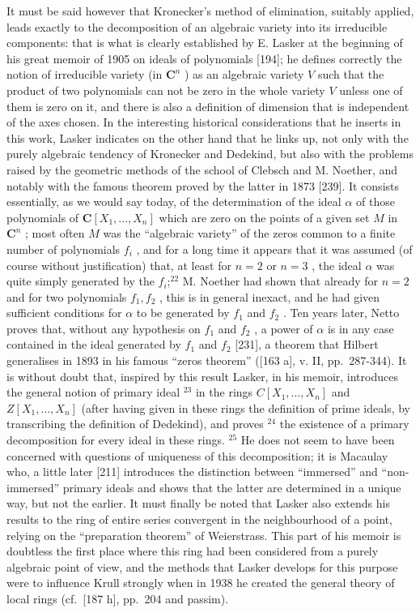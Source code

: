 It must be said however that Kronecker's method of elimination, suitably applied, leads exactly to the decomposition of an algebraic variety into its irreducible components: that is what is clearly established by E. Lasker at the beginning of his great memoir of 1905 on ideals of polynomials {[}194{]}; he defines correctly the notion of irreducible variety (in \(\mathbf{C}^n\) ) as an algebraic variety \(V\) such that the product of two polynomials can not be zero in the whole variety \(V\) unless one of them is zero on it, and there is also a definition of dimension that is independent of the axes chosen. In the interesting historical considerations that he inserts in this work, Lasker indicates on the other hand that he links up, not only with the purely algebraic tendency of Kronecker and Dedekind, but also with the problems raised by the geometric methods of the school of Clebsch and M. Noether, and notably with the famous theorem proved by the latter in 1873 {[}239{]}. It consists essentially, as we would say today, of the determination of the ideal \(\alpha\) of those polynomials of \(\mathbf{C}[X_1,\ldots ,X_n]\) which are zero on the points of a given set \(M\) in \(\mathbf{C}^n\) ; most often \(M\) was the ``algebraic variety'' of the zeros common to a finite number of polynomials \(f_{i}\) , and for a long time it appears that it was assumed (of course without justification) that, at least for \(n = 2\) or \(n = 3\) , the ideal \(\alpha\) was quite simply generated by the \(f_{i}\);\(^{22}\) M. Noether had shown that already for \(n = 2\) and for two polynomials \(f_{1},f_{2}\) , this is in general inexact, and he had given sufficient conditions for \(\alpha\) to be generated by \(f_{1}\) and \(f_{2}\) . Ten years later, Netto proves that, without any hypothesis on \(f_{1}\) and \(f_{2}\) , a power of \(\alpha\) is in any case contained in the ideal generated by \(f_{1}\) and \(f_{2}\) {[}231{]}, a theorem that Hilbert generalises in 1893 in his famous ``zeros theorem'' ({[}163 a{]}, v. II, pp.~287-344). It is without doubt that, inspired by this result Lasker, in his memoir, introduces the general notion of primary ideal \(^{23}\) in the rings \(C[X_{1},\ldots,X_{n}]\) and \(Z[X_{1},\ldots,X_{n}]\) (after having given in these rings the definition of prime ideals, by transcribing the definition of Dedekind), and proves \(^{24}\) the existence of a primary decomposition for every ideal in these rings. \(^{25}\) He does not seem to have been concerned with questions of uniqueness of this decomposition; it is Macaulay who, a little later {[}211{]} introduces the distinction between ``immersed'' and ``non-immersed'' primary ideals and shows that the latter are determined in a unique way, but not the earlier. It must finally be noted that Lasker also extends his results to the ring of entire series convergent in the neighbourhood of a point, relying on the ``preparation theorem'' of Weierstrass. This part of his memoir is doubtless the first place where this ring had been considered from a purely algebraic point of view, and the methods that Lasker develops for this purpose were to influence Krull strongly when in 1938 he created the general theory of local rings (cf.~{[}187 h{]}, pp.~204 and passim).

